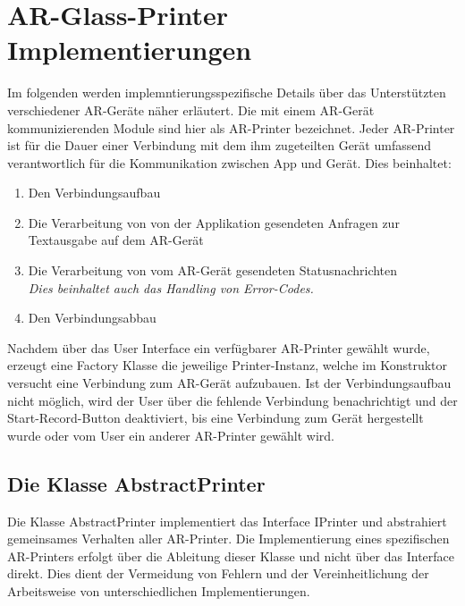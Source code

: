 \chapter{AR-Glass-Printer Implementierungen}
Im folgenden werden implemntierungsspezifische Details über das Unterstützten verschiedener AR-Geräte näher erläutert. Die mit einem AR-Gerät kommunizierenden Module sind hier als AR-Printer bezeichnet. 
Jeder AR-Printer ist für die Dauer einer Verbindung mit dem ihm zugeteilten Gerät umfassend verantwortlich für die Kommunikation zwischen App und Gerät.  Dies beinhaltet: 
\begin{enumerate}
	\item Den Verbindungsaufbau
	\item Die Verarbeitung von von der Applikation gesendeten Anfragen zur Textausgabe auf dem AR-Gerät
	\item Die Verarbeitung von vom AR-Gerät gesendeten Statusnachrichten\\
	\textit{Dies beinhaltet auch das Handling von Error-Codes.}
	\item Den Verbindungsabbau
\end{enumerate}
\par
Nachdem über das User Interface ein verfügbarer AR-Printer gewählt wurde, erzeugt eine Factory Klasse die jeweilige Printer-Instanz, welche im Konstruktor versucht eine Verbindung zum AR-Gerät aufzubauen. Ist der Verbindungsaufbau nicht möglich, wird der User über die fehlende Verbindung benachrichtigt und der Start-Record-Button deaktiviert, bis eine Verbindung zum Gerät hergestellt wurde oder vom User ein anderer AR-Printer gewählt wird.

\section{Die Klasse AbstractPrinter}
Die Klasse AbstractPrinter implementiert das Interface IPrinter und abstrahiert gemeinsames Verhalten aller AR-Printer. Die Implementierung eines spezifischen AR-Printers erfolgt über die Ableitung dieser Klasse und nicht über das Interface direkt. Dies dient der Vermeidung von Fehlern und der Vereinheitlichung der Arbeitsweise von unterschiedlichen Implementierungen.\\
